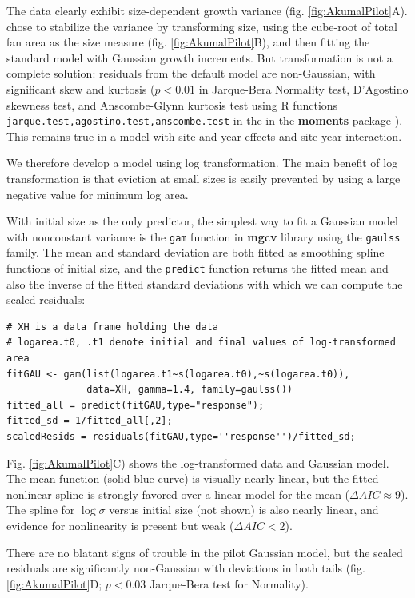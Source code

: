 \documentclass[12pt]{article}
\newcommand{\tom}[2]{{\color{red}{#1}}\footnote{\textit{\color{red}{#2}}}}
\begin{document}
The data clearly exhibit size-dependent growth variance (fig. \ref{fig:AkumalPilot}A). 
\citet{bruno-etal-2011} chose to stabilize the variance by transforming size,
using the cube-root of total fan area as the size measure (fig. \ref{fig:AkumalPilot}B), and then fitting the standard 
model with Gaussian growth increments. But transformation is not a complete solution: residuals from 
the default model are non-Gaussian, with significant skew and kurtosis ($p<0.01$ in Jarque-Bera Normality test, D'Agostino skewness test, 
and Anscombe-Glynn kurtosis test using R functions \texttt{jarque.test,agostino.test,anscombe.test} in the 
in the \textbf{moments} package \citep{komsta-2015}). This remains true in a model with site and year effects and 
site-year interaction. 

We therefore develop a model using log transformation. The main benefit of log transformation is that 
eviction at small sizes is easily prevented by using a large negative value for minimum log area. 

With initial size as the only predictor, the simplest way to fit a Gaussian model with nonconstant variance is the
\texttt{gam} function in \textbf{mgcv} library \citep{wood-2017} using the \texttt{gaulss} family. The mean and 
standard deviation are both fitted as smoothing spline functions of initial size, and the \texttt{predict} function
returns the fitted mean and also the inverse of the fitted standard deviations with which we can compute the scaled residuals: 
\begin{lstlisting}
# XH is a data frame holding the data
# logarea.t0, .t1 denote initial and final values of log-transformed area   
fitGAU <- gam(list(logarea.t1~s(logarea.t0),~s(logarea.t0)),
              data=XH, gamma=1.4, family=gaulss())
fitted_all = predict(fitGAU,type="response"); 
fitted_sd = 1/fitted_all[,2]; 
scaledResids = residuals(fitGAU,type=''response'')/fitted_sd;  
\end{lstlisting}
Fig. \ref{fig:AkumalPilot}C) shows the log-transformed data and Gaussian model. The mean function (solid blue curve) 
is visually nearly linear, but the fitted nonlinear spline is strongly favored over a linear model for the mean ($\Delta AIC \approx 9$). 
The spline for $\log \sigma$ versus initial size (not shown) is also nearly linear, and evidence for nonlinearity is present but 
weak ($\Delta AIC <2$). 

There are no blatant signs of trouble in the pilot Gaussian model, but the scaled residuals are 
significantly non-Gaussian with deviations in both tails (fig. \ref{fig:AkumalPilot}D; $p<0.03$ Jarque-Bera test for Normality).
\end{document}
